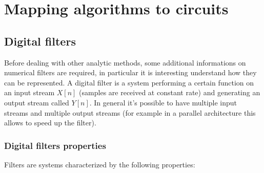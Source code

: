 \chapter{Mapping algorithms to circuits}

\section{Digital filters}
Before dealing with other analytic methods, some additional informations on numerical filters are required, in particular it is interesting understand how they can be represented. A digital filter is a system performing a certain function on an input stream $X[n]$ (samples are received at constant rate) and generating an output stream called $Y[n]$. In general it's possible to have multiple input streams and multiple output streams (for example in a parallel architecture this allows to speed up the filter).

\subsection{Digital filters properties}
Filters are systems characterized by the following properties:

